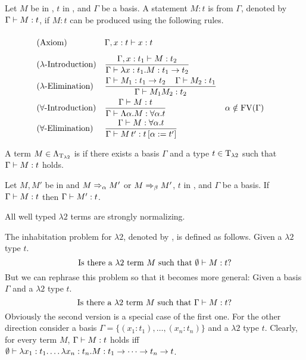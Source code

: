 \begin{definition}\label{def.2.10}
Let $M$ be in \lambdaTerms{}, $t$ in \lambdaTypes, and $\Gamma$ be a basis. A statement $M:t$ is  from $\Gamma$, denoted by $\Gamma\vdash M:t$, if $M:t$ can be produced using the following rules.
\begin{mdframed} 
	\begingroup
	\addtolength{\jot}{0.3cm}
	\begin{align*}
		&(\text{Axiom}) &&\Gamma,x:t\lambdaModels x:t\vphantom{\frac{t_1}{t_1}}\\
		&(\lambda\text{-Introduction}) &&\frac{\Gamma,x:t_1\lambdaModels M:t_2}{\Gamma\lambdaModels \lambda x:t_1.M:t_1\to t_2}\\
		&(\lambda\text{-Elimination}) &&\frac{\Gamma\lambdaModels M_1:t_1\to t_2 \hspace{0.4cm}\Gamma\lambdaModels M_2:t_1}{\Gamma\lambdaModels M_1M_2:t_2}\\
& (\forall\text{-Introduction}) &   & \frac{\Gamma\lambdaModels M:t}{\Gamma\lambdaModels \Lambda\alpha.M:\forall\alpha.t}                 &   & \alpha\notin\FV(\Gamma) \\
& (\forall\text{-Elimination})  &   & \frac{\Gamma\lambdaModels M:\forall\alpha.t }{\Gamma\lambdaModels M\,t':t\left[ \alpha:=t'\right] } 
	\end{align*}
	\endgroup
\end{mdframed}
\end{definition}

\begin{definition}\label{def.2.11}
A term $M\in\Lambda_{\text{T}_{\lambda2}}$ is  if there exists a basis $\Gamma$ and a type $t\in\text{T}_{\lambda2}$ such that $\Gamma\vdash M:t$ holds.
\end{definition}

\begin{theorem}\label{the.2.12}
Let $M,M'$ be in \lambdaTerms{} and $M\Rightarrow_\alpha M'$ or $M\Rightarrow_\beta M'$, $t$ in \lambdaTypes, and $\Gamma$ be a basis. If $\Gamma\vdash M:t$ then $\Gamma\vdash M':t$.
\end{theorem}

\begin{theorem}\label{the.2.13}
All well typed $\lambda2$ terms are strongly normalizing.
\end{theorem}

\begin{definition}\label{def.2.14}
The inhabitation problem for $\lambda2$, denoted by \lambdaInhab, is defined as follows. Given a $\lambda2$ type $t$.
\[\text{Is there a $\lambda2$ term $M$ such that } \emptyset\vdash M:t?\]
But we can rephrase this problem so that it becomes more general:
Given a basis $\Gamma$ and a $\lambda2$ type $t$.
\[\text{Is there a $\lambda2$ term $M$ such that } \Gamma\vdash M:t?\]
Obviously the second version is a special case of the first one. For the other direction consider a basis $\Gamma=\{(x_1:t_1),\dots,(x_n:t_n)\}$ and a $\lambda2$ type $t$. Clearly, for every term $M$, $\Gamma\vdash M:t$ holds iff $\emptyset\vdash \lambda x_1:t_1.\dots\lambda x_n:t_n.M:t_1\to\dots\to t_n\to t$.
\end{definition}
